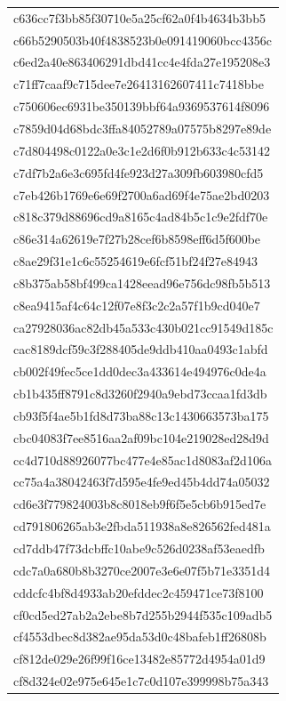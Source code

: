 \begin{tabular}{l}
c636cc7f3bb85f30710e5a25cf62a0f4b4634b3bb5 \\
c66b5290503b40f4838523b0e091419060bcc4356c \\
c6ed2a40e863406291dbd41cc4e4fda27e195208e3 \\
c71ff7caaf9c715dee7e26413162607411c7418bbe \\
c750606ec6931be350139bbf64a9369537614f8096 \\
c7859d04d68bdc3ffa84052789a07575b8297e89de \\
c7d804498c0122a0e3c1e2d6f0b912b633c4c53142 \\
c7df7b2a6e3c695fd4fe923d27a309fb603980cfd5 \\
c7eb426b1769e6e69f2700a6ad69f4e75ae2bd0203 \\
c818c379d88696cd9a8165c4ad84b5c1c9e2fdf70e \\
c86e314a62619e7f27b28cef6b8598eff6d5f600be \\
c8ae29f31e1c6c55254619e6fcf51bf24f27e84943 \\
c8b375ab58bf499ca1428eead96e756dc98fb5b513 \\
c8ea9415af4c64c12f07e8f3c2c2a57f1b9cd040e7 \\
ca27928036ac82db45a533c430b021cc91549d185c \\
cac8189dcf59c3f288405de9ddb410aa0493c1abfd \\
cb002f49fec5ce1dd0dec3a433614e494976c0de4a \\
cb1b435ff8791c8d3260f2940a9ebd73ccaa1fd3db \\
cb93f5f4ae5b1fd8d73ba88c13c1430663573ba175 \\
cbc04083f7ee8516aa2af09bc104e219028ed28d9d \\
cc4d710d88926077bc477e4e85ac1d8083af2d106a \\
cc75a4a38042463f7d595e4fe9ed45b4dd74a05032 \\
cd6e3f779824003b8c8018eb9f6f5e5cb6b915ed7e \\
cd791806265ab3e2fbda511938a8e826562fed481a \\
cd7ddb47f73dcbffc10abe9c526d0238af53eaedfb \\
cdc7a0a680b8b3270ce2007e3e6e07f5b71e3351d4 \\
cddcfc4bf8d4933ab20efddec2c459471ce73f8100 \\
cf0cd5ed27ab2a2ebe8b7d255b2944f535c109adb5 \\
cf4553dbec8d382ae95da53d0c48bafeb1ff26808b \\
cf812de029e26f99f16ce13482e85772d4954a01d9 \\
cf8d324e02e975e645e1c7c0d107e399998b75a343 \\

\end{tabular}
